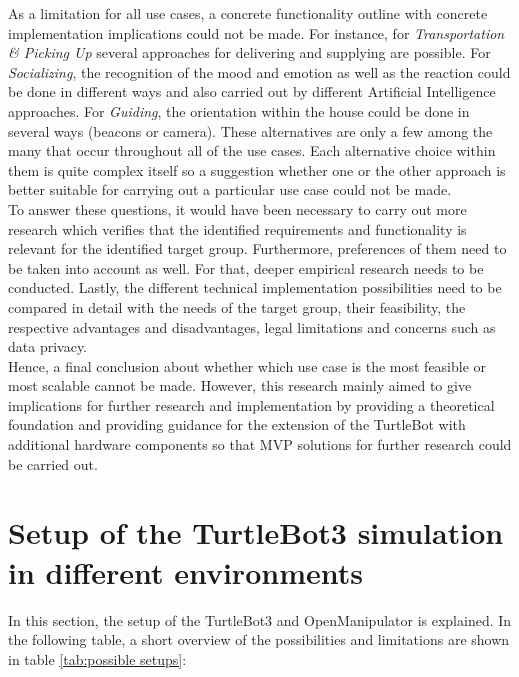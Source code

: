 \documentclass[plainarticle,zihtitle,english,final,hyperref,utf8]{zihpub}
\begin{document}
\newline
As a limitation for all use cases, a concrete functionality outline with concrete implementation implications could not be made. For instance, for \textit{Transportation \& Picking Up} several approaches for delivering and supplying are possible. For \textit{Socializing}, the recognition of the mood and emotion as well as the reaction could be done in different ways and also carried out by different Artificial Intelligence approaches. For \textit{Guiding}, the orientation within the house could be done in several ways (beacons or camera). These alternatives are only a few among the many that occur throughout all of the use cases. Each alternative choice within them is quite complex itself so a suggestion whether one or the other approach is better suitable for carrying out a particular use case could not be made. \\
\newline
To answer these questions, it would have been necessary to carry out more research which verifies that the identified requirements and functionality is relevant for the identified target group. Furthermore, preferences of them need to be taken into account as well. For that, deeper empirical research needs to be conducted. Lastly, the different technical implementation possibilities need to be compared in detail with the needs of the target group, their feasibility, the respective advantages and disadvantages, legal limitations and concerns such as data privacy. \\
\newline
Hence, a final conclusion about whether which use case is the most feasible or most scalable cannot be made. However, this research mainly aimed to give implications for further research and implementation by providing a theoretical foundation and providing guidance for the extension of the TurtleBot with additional hardware components so that MVP solutions for further research could be carried out.
\newpage
\section{Setup of the TurtleBot3 simulation in different environments}
In this section, the setup of the TurtleBot3 and OpenManipulator is explained. In the following table, a short overview of the possibilities and limitations are shown in table \ref{tab:possible setups}:
\end{document}
